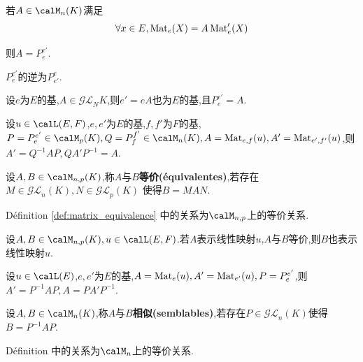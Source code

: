\begin{lem}
    若$A \in \calM_n(K)$满足
    \[ \forall x \in E, \operatorname{Mat}_e(X) = A \operatorname{Mat}_e'(X) \]

    则$A = P_e^{e'}$.
\end{lem}

\begin{prop}
    $P_e^{e'}$的逆为$P_{e'}^e$.
\end{prop}

\begin{rqq}
    设$e$为$E$的基,$A \in \mathcal{GL}_N{K}$,则$e' = eA$也为$E$的基,且$P_e^{e'} = A$.
\end{rqq}

\begin{prop}
    设$u \in \calL(E, F)$,$e, e'$为$E$的基,$f, f'$为$F$的基,$P = P_e^{e'} \in \calM_p(K), Q = P_f^{f'} \in \calM_n(K),
    A = \mat_{e, f}(u), A' = \mat_{e', f'}(u)$,则$A' = Q^{-1}AP, QA'P^{-1} = A$.
\end{prop}

\begin{deff} \label{def:matrix_equivalence}
    设$A, B \in \calM_{n, p}(K)$,称$A$与$B$\textbf{等价(équivalentes)},若存在$M \in \mathcal{GL}_n(K), N \in \mathcal{GL}_p(K)$
    使得$B = MAN$.
\end{deff}

\begin{rqq}
    Définition \ref{def:matrix_equivalence} 中的关系为$\calM_{n, p}$上的等价关系.
\end{rqq}

\begin{prop}
    设$A, B \in \calM_{n, p}(K), u \in \calL(E, F)$.若$A$表示线性映射$u$,$A$与$B$等价,则$B$也表示线性映射$u$.
\end{prop}

\begin{cor}
    设$u \in \calL(E)$,$e, e'$为$E$的基,$A = \operatorname{Mat}_e(u), A' = \operatorname{Mat}_{e'}(u), P = P_e^{e'}$,则$A' = P^{-1}AP, A = PA'P^{-1}$.
\end{cor}

\begin{deff} \label{def:matrix_similarity}
    设$A, B \in \calM_n(K)$,称$A$与$B$\textbf{相似(semblables)},若存在$P \in \mathcal{GL}_n(K)$使得$B = P^{-1}AP$.
\end{deff}

\begin{rqq}
    Définition \label{def:matrix_similarity} 中的关系为$\calM_n$上的等价关系.
\end{rqq}

